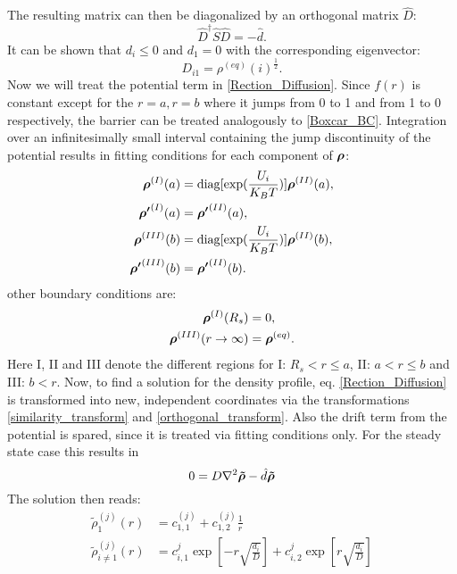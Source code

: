 The resulting matrix can then be diagonalized by an orthogonal matrix $\hat{D}$:
\begin{equation}
    \hat{D}^{\dagger} \hat{S} \hat{D} = -\hat{d}.
    \label{orthogonal_transform}
\end{equation}
It can be shown that $d_i \le 0$ and $d_1 = 0$ with the corresponding eigenvector:
\begin{equation}
    D_{i1} = \rho^{(eq)}(i)^{\frac{1}{2}}.
\end{equation}
Now we will treat the potential term in \eqref{Rection_Diffusion}. Since $f(r)$ is constant except for the $r = a, r = b$ where it jumps from 0 to 1 and from 1 to 0 respectively, the barrier can be treated analogously to \eqref{Boxcar_BC}. Integration over an infinitesimally small interval containing the jump discontinuity of the potential results in fitting conditions for each component of  $\boldsymbol{\mathbf{\rho}}$:
\begin{align}
    \boldsymbol{\mathbf{\rho}}^{(I)}(a) &= \mathrm{diag}[\exp(\frac{U_i}{K_B T})] \boldsymbol{\mathbf{\rho}}^{(II)}(a), \nonumber \\ \nonumber
    \boldsymbol{\mathbf{\rho '}}^{(I)}(a) &= \boldsymbol{\mathbf{\rho '}}^{(II)}(a), \\ \nonumber
    \boldsymbol{\mathbf{\rho}}^{(III)}(b) &= \mathrm{diag}[\exp(\frac{U_i}{K_B T})] \boldsymbol{\mathbf{\rho}}^{(II)}(b), \\ 
    \boldsymbol{\mathbf{\rho '}}^{(III)}(b) &= \boldsymbol{\mathbf{\rho '}}^{(II)}(b).
    \label{fitting_conditions}
\end{align}
other boundary conditions are:
\begin{align}
    \boldsymbol{\mathbf{\rho}}^{(I)}(R_s) &= 0, \nonumber \\ 
    \boldsymbol{\mathbf{\rho}}^{(III)}(r \rightarrow \infty) &= \boldsymbol{\mathbf{\rho}}^{(eq)}.
    \label{fp_bc}
\end{align}
Here I, II and III denote the different regions for I: $ R_s < r \le a$, II: $a < r \le b$ and III: $ b < r$.
Now, to find a solution for the density profile, eq. \eqref{Rection_Diffusion} is transformed into new, independent coordinates via the transformations \eqref{similarity_transform} and \eqref{orthogonal_transform}. Also the drift term from the potential is spared, since it is treated via fitting conditions only. For the steady state case this results in
\begin{equation}
    0 = D \nabla^{2} \boldsymbol{\mathbf{\tilde{\rho}}} - \hat{d} \boldsymbol{\mathbf{\tilde{\rho}}}
    \label{independent_rd}
\end{equation}
The solution then reads:
\begin{align}
    \tilde{\rho}_{1}^{(j)}(r) &= c_{1,1}^{(j)} + c_{1,2}^{(j)} \frac{1}{r} \nonumber \\
    \tilde{\rho}_{i \ne 1}^{(j)}(r) &= c_{i,1}^{j} \exp\left[-r\sqrt{\frac{d_i}{D}}\right] + c_{i,2}^{j} \exp\left[r\sqrt{\frac{d_i}{D}}\right] 
    \label{fp_ind_sol}
\end{align}
